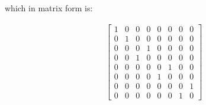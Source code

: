 \documentclass[main.tex]{subfiles}
\begin{document}
\begin{enumerate}
    which in matrix form is:
    
    \begin{align*}
        \left[\begin{array}{llllllll}1 & 0 & 0 & 0 & 0 & 0 & 0 & 0 \\ 
        0 & 1 & 0 & 0 & 0 & 0 & 0 & 0 \\ 
        0 & 0 & 0 & 1 & 0 & 0 & 0 & 0 \\ 
        0 & 0 & 1 & 0 & 0 & 0 & 0 & 0 \\ 
        0 & 0 & 0 & 0 & 0 & 1 & 0 & 0 \\ 
        0 & 0 & 0 & 0 & 1 & 0 & 0 & 0 \\ 
        0 & 0 & 0 & 0 & 0 & 0 & 0 & 1 \\ 
        0 & 0 & 0 & 0 & 0 & 0 & 1 & 0\end{array}\right]
    \end{align*}

\end{enumerate}
\end{document}
